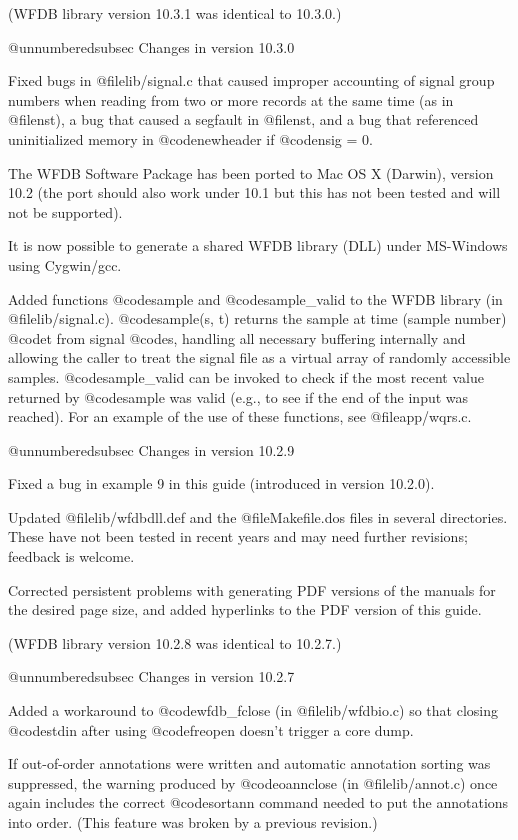 (WFDB library version 10.3.1 was identical to 10.3.0.)

@unnumberedsubsec Changes in version 10.3.0

Fixed bugs in @file{lib/signal.c} that caused improper accounting of signal
group numbers when reading from two or more records at the same time (as in
@file{nst}), a bug that caused a segfault in @file{nst}, and a bug that
referenced uninitialized memory in @code{newheader} if @code{nsig} = 0.

The WFDB Software Package has been ported to Mac OS X (Darwin),
version 10.2 (the port should also work under 10.1 but this
has not been tested and will not be supported).	

It is now possible to generate a shared WFDB library (DLL)
under MS-Windows using Cygwin/gcc.

Added functions @code{sample} and @code{sample_valid} to the WFDB library
(in @file{lib/signal.c}).  @code{sample(s, t)} returns the sample at
time (sample number) @code{t} from signal @code{s}, handling all
necessary buffering internally and allowing the caller to treat the
signal file as a virtual array of randomly accessible samples.
@code{sample_valid} can be invoked to check if the most recent value
returned by @code{sample} was valid (e.g., to see if the end of the
input was reached).  For an example of the use of these functions, see
@file{app/wqrs.c}.

@unnumberedsubsec Changes in version 10.2.9

Fixed a bug in example 9 in this guide (introduced in version 10.2.0).

Updated @file{lib/wfdbdll.def} and the @file{Makefile.dos} files in several
directories.  These have not been tested in recent years and may need further
revisions; feedback is welcome.

Corrected persistent problems with generating PDF versions of the manuals for
the desired page size, and added hyperlinks to the PDF version of this guide.

(WFDB library version 10.2.8 was identical to 10.2.7.)

@unnumberedsubsec Changes in version 10.2.7

Added a workaround to @code{wfdb_fclose} (in @file{lib/wfdbio.c}) so that
closing @code{stdin} after using @code{freopen} doesn't trigger a core dump.

If out-of-order annotations were written and automatic annotation sorting was
suppressed, the warning produced by @code{oannclose} (in @file{lib/annot.c})
once again includes the correct @code{sortann} command needed to put the
annotations into order.  (This feature was broken by a previous revision.)

